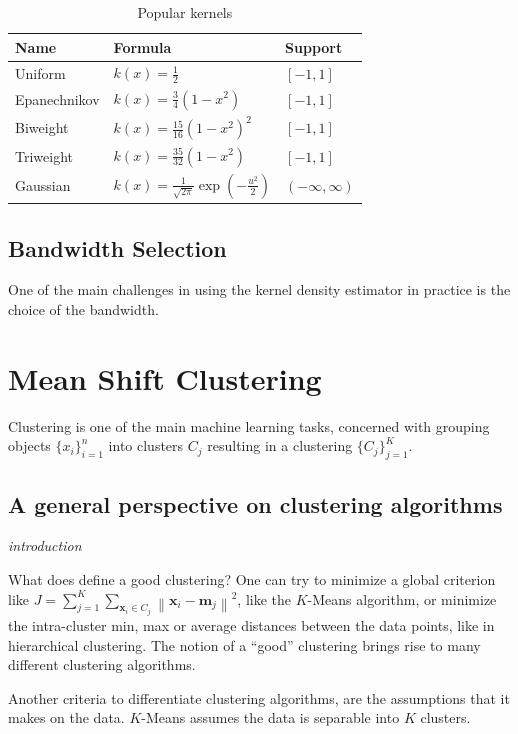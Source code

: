 \documentclass{article}
\newcommand{\norm}[1]{\left\lVert#1\right\rVert}
\begin{document}
\begin{table}[]
	\centering
	\begin{tabular}{lll}
		\hline
		Name & Formula & Support \\ \hline
		Uniform & $k(x) = \frac{1}{2}$ & $[-1, 1]$ \\
		Epanechnikov & $k(x) = \frac{3}{4} (1 - x^2)$ & $[-1, 1]$ \\
		Biweight & $k(x) = \frac{15}{16} (1 - x^2)^2$ & $[-1, 1]$ \\
		Triweight & $k(x) = \frac{35}{32} (1 - x^2)$ & $[-1, 1]$ \\
		Gaussian & $k(x) = \frac{1}{\sqrt{2\pi}}\exp(-\frac{u^2}{2}) $ & $(-\infty, \infty)$
	\end{tabular}
	\caption{Popular kernels}
	\label{tab:popular-kernels}
\end{table}

\subsection{Bandwidth Selection}

One of the main challenges in using the kernel density estimator in practice is the choice of the bandwidth.


\section{Mean Shift Clustering}

Clustering is one of the main machine learning tasks, concerned with grouping objects $\{x_i\}_{i=1}^n$ into clusters $C_j$ resulting in a clustering $\{ C_j \}_{j=1}^K$.

\subsection{A general perspective on clustering algorithms}

\textit{introduction}

What does define a good clustering? One can try to minimize a global criterion like $J = \sum_{j=1}^K \sum_{\bm{x}_i \in C_j} \norm{\bm{x}_i - \bm{m}_j}^2$, like the $K$-Means algorithm, or minimize the intra-cluster min, max or average distances between the data points, like in hierarchical clustering. The notion of a ``good'' clustering brings rise to many different clustering algorithms.

Another criteria to differentiate clustering algorithms, are the assumptions that it makes on the data. $K$-Means assumes the data is separable into $K$ clusters. 
\end{document}
